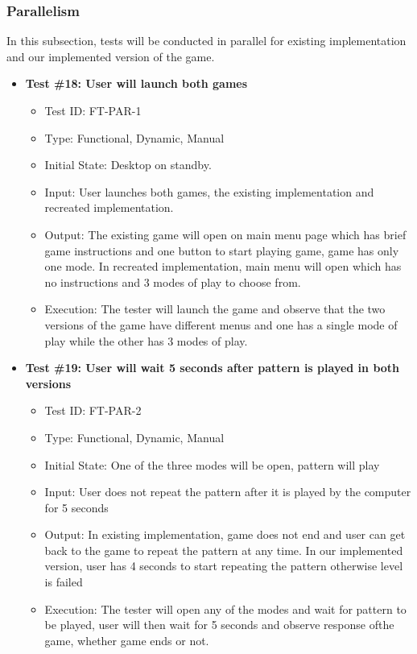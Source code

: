 \documentclass[12pt, titlepage]{article}
\begin{document}
\subsubsection{Parallelism}
In this subsection, tests will be conducted in parallel for existing implementation and our implemented version of the game.
\begin{itemize}

\item \textbf{Test \#18: User will launch both games }
\begin{itemize}
\item Test ID: FT-PAR-1
\item Type: Functional, Dynamic, Manual 		
\item Initial State: Desktop on standby.					
\item Input: User launches both games, the existing implementation and recreated implementation. 	
\item Output: The existing game will open on main menu page which has brief game instructions and one button to start playing game, game has only one mode. In recreated implementation, main menu will open which has no instructions and 3 modes of play to choose from.
\item Execution: The tester will launch the game and observe that the two versions of the game have different menus and one has a single mode of play while the other has 3 modes of play.
\end{itemize}

\item \textbf{Test \#19: User will wait 5 seconds after pattern is played in both versions }
\begin{itemize}
\item Test ID: FT-PAR-2
\item Type: Functional, Dynamic, Manual 		
\item Initial State: One of the three modes will be open, pattern will play					
\item Input: User does not repeat the pattern after it is played by the computer for 5 seconds	
\item Output: In existing implementation, game does not end and user can get back to the game to repeat the pattern at any time. In our implemented version, user has 4 seconds to start repeating the pattern otherwise level is failed				
\item Execution: The tester will open any of the modes and wait for pattern to be played, user will then wait for 5 seconds and observe response ofthe game, whether game ends or not.
\end{itemize}


\end{itemize}
\end{document}
